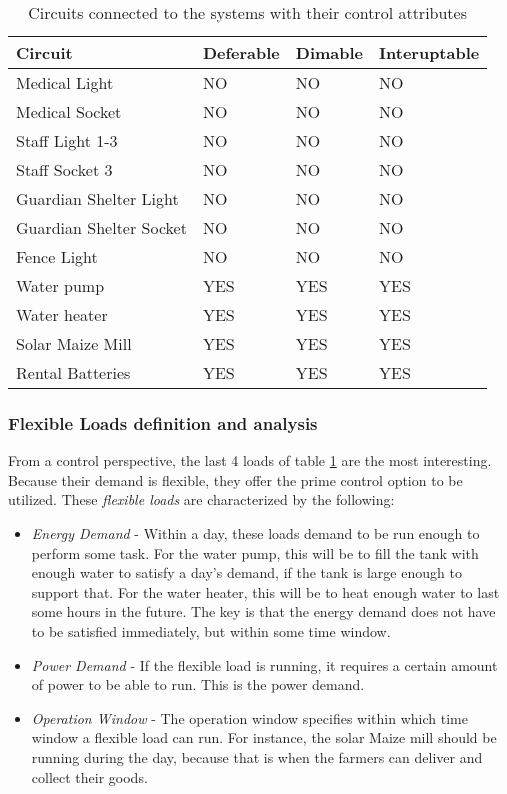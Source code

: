 \begin{table}[]
    \centering
    \small
    \begin{tabular}{|>{\raggedright\arraybackslash}p{4cm}|p{1.5cm}|p{1.5cm}|p{2cm}|}
         Circuit & Deferable & Dimable & Interuptable \\
         \hline
         Medical Light & NO & NO & NO\\
         Medical Socket & NO & NO & NO\\
         Staff Light 1-3 & NO & NO & NO\\
         Staff Socket 3 & NO & NO & NO\\
         Guardian Shelter Light & NO & NO & NO\\
         Guardian Shelter Socket & NO & NO & NO\\
         Fence Light & NO & NO & NO\\
         \hline
         Water pump & YES & YES & YES\\
         Water heater & YES & YES & YES\\
         \hline
         Solar Maize Mill & YES & YES & YES\\
         Rental Batteries & YES & YES & YES\\
         \hline
    \end{tabular}
    \caption[Circuits control attributes]{Circuits connected to the systems with their control attributes}
    \label{tab:circuit_control}
\end{table}

\subsubsection{Flexible Loads definition and analysis}\label{seq:flex_loads}
From a control perspective, the last 4 loads of table \ref{tab:circuit_control} are the most interesting. Because their demand is flexible, they offer the prime control option to be utilized. These \textit{flexible loads} are characterized by the following:
\begin{itemize}
    \item \textit{Energy Demand}    -   Within a day, these loads demand to be run enough to perform some task. For the water pump, this will be to fill the tank with enough water to satisfy a day's demand, if the tank is large enough to support that. For the water heater, this will be to heat enough water to last some hours in the future. The key is that the energy demand does not have to be satisfied immediately, but within some time window.
    \item \textit{Power Demand}     -   If the flexible load is running, it requires a certain amount of power to be able to run. This is the power demand. 
    \item \textit{Operation Window} -   The operation window specifies within which time window a flexible load can run. For instance, the solar Maize mill should be running during the day, because that is when the farmers can deliver and collect their goods.   
\end{itemize}

